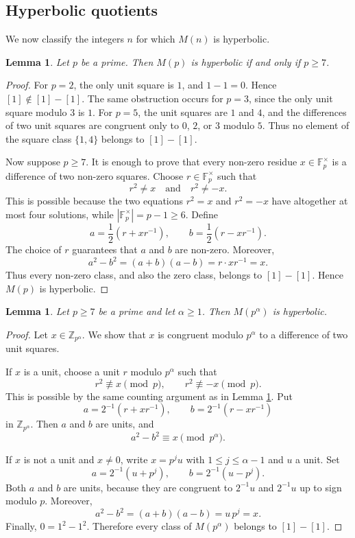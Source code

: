 \documentclass[a4paper,10pt]{article}
\newtheorem{lem}[teo]{Lemma} %
\newcommand{\cl}[1]{\left[#1\right]}
\begin{document}
\subsection{Hyperbolic quotients}

We now classify the integers $n$ for which $M(n)$ is hyperbolic.

\begin{lem}\label{lem:prime-hyp}
Let $p$ be a prime.  Then $M(p)$ is hyperbolic if and only if $p\ge7$.
\end{lem}

\begin{proof}
For $p=2$, the only unit square is $1$, and $1-1=0$.  Hence $\cl1\notin\cl1-\cl1$.  The same obstruction occurs for $p=3$, since the only unit square modulo $3$ is $1$.  For $p=5$, the unit squares are $1$ and $4$, and the differences of two unit squares are congruent only to $0$, $2$, or $3$ modulo $5$.  Thus no element of the square class $\{1,4\}$ belongs to $\cl1-\cl1$.

Now suppose $p\ge7$.  It is enough to prove that every non-zero residue $x\in\mathbb F_p^\times$ is a difference of two non-zero squares.  Choose $r\in\mathbb F_p^\times$ such that
\[
        r^2\ne x\quad\mbox{and}\quad r^2\ne -x.
\]
This is possible because the two equations $r^2=x$ and $r^2=-x$ have altogether at most four solutions, while $|\mathbb F_p^\times|=p-1\ge6$.  Define
\[
        a=\frac{1}{2}\left(r+xr^{-1}\right),
        \qquad
        b=\frac{1}{2}\left(r-xr^{-1}\right).
\]
The choice of $r$ guarantees that $a$ and $b$ are non-zero.  Moreover,
\[
        a^2-b^2=(a+b)(a-b)=r\cdot xr^{-1}=x.
\]
Thus every non-zero class, and also the zero class, belongs to $\cl1-\cl1$.  Hence $M(p)$ is hyperbolic.
\end{proof}

\begin{lem}\label{lem:prime-power-hyp}
Let $p\ge7$ be a prime and let $\alpha\ge1$.  Then $M(p^\alpha)$ is hyperbolic.
\end{lem}

\begin{proof}
Let $x\in\mathbb Z_{p^\alpha}$.  We show that $x$ is congruent modulo $p^\alpha$ to a difference of two unit squares.

If $x$ is a unit, choose a unit $r$ modulo $p^\alpha$ such that
\[
        r^2\not\equiv x\pmod p,
        \qquad
        r^2\not\equiv -x\pmod p.
\]
This is possible by the same counting argument as in Lemma \ref{lem:prime-hyp}.  Put
\[
        a=2^{-1}(r+xr^{-1}),
        \qquad
        b=2^{-1}(r-xr^{-1})
\]
in $\mathbb Z_{p^\alpha}$.  Then $a$ and $b$ are units, and
\[
        a^2-b^2\equiv x\pmod{p^\alpha}.
\]

If $x$ is not a unit and $x\ne0$, write $x=p^j u$ with $1\le j\le\alpha-1$ and $u$ a unit.  Set
\[
        a=2^{-1}(u+p^j),
        \qquad
        b=2^{-1}(u-p^j).
\]
Both $a$ and $b$ are units, because they are congruent to $2^{-1}u$ and $2^{-1}u$ up to sign modulo $p$.  Moreover,
\[
        a^2-b^2=(a+b)(a-b)=u\,p^j=x.
\]
Finally, $0=1^2-1^2$.  Therefore every class of $M(p^\alpha)$ belongs to $\cl1-\cl1$.
\end{proof}
\end{document}
